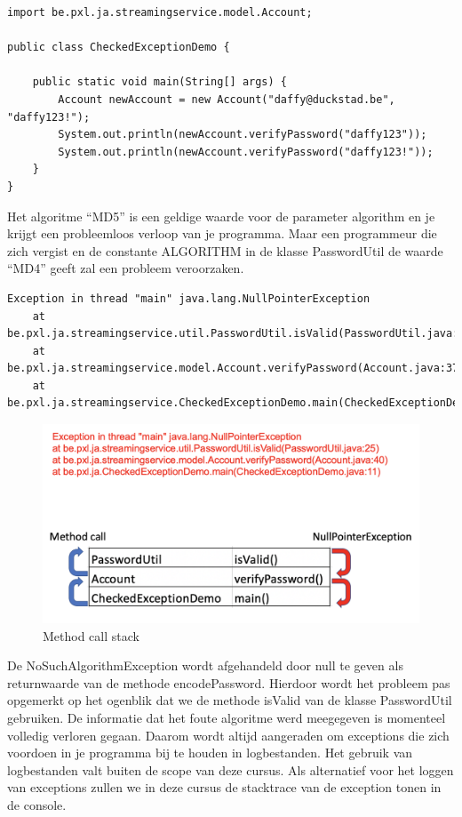 \documentclass{tstextbook}
\begin{document}
\begin{lstlisting}
import be.pxl.ja.streamingservice.model.Account;

public class CheckedExceptionDemo {

	public static void main(String[] args) {
		Account newAccount = new Account("daffy@duckstad.be", "daffy123!");
		System.out.println(newAccount.verifyPassword("daffy123"));
		System.out.println(newAccount.verifyPassword("daffy123!"));
	}
}
\end{lstlisting}

Het algoritme ``MD5'' is een geldige waarde voor de parameter algorithm en je krijgt een probleemloos verloop van je programma. Maar een programmeur die zich vergist en de constante ALGORITHM in de klasse PasswordUtil de waarde ``MD4'' geeft zal een probleem veroorzaken.

\begin{verbatim}
Exception in thread "main" java.lang.NullPointerException
	at be.pxl.ja.streamingservice.util.PasswordUtil.isValid(PasswordUtil.java:24)
	at be.pxl.ja.streamingservice.model.Account.verifyPassword(Account.java:37)
	at be.pxl.ja.streamingservice.CheckedExceptionDemo.main(CheckedExceptionDemo.java:9)
\end{verbatim}

\begin{figure}[H]
\includegraphics[width=\linewidth]{images/h2/exception_call_stack.png}
\caption{Method call stack}
\label{fig:method_call_stack}
\end{figure}

De NoSuchAlgorithmException wordt afgehandeld door null te geven als returnwaarde van de methode encodePassword.  Hierdoor wordt het probleem pas opgemerkt op het ogenblik dat we de methode isValid van de klasse PasswordUtil gebruiken. De informatie dat het foute algoritme werd meegegeven is momenteel volledig verloren gegaan. Daarom wordt altijd aangeraden om exceptions die zich voordoen in je programma bij te houden in logbestanden. Het gebruik van logbestanden valt buiten de scope van deze cursus. Als alternatief voor het loggen van exceptions zullen we in deze cursus de stacktrace van de exception tonen in de console.
\end{document}
